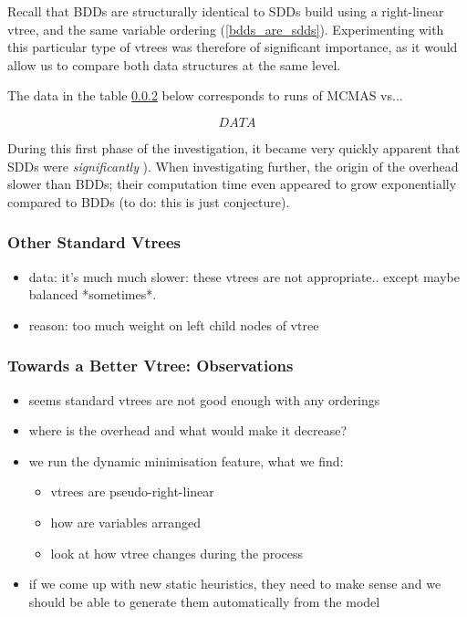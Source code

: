 \documentclass[11pt]{article}
\begin{document}
Recall that BDDs are structurally identical to SDDs build using a right-linear vtree, and the same variable ordering (\ref{bdds_are_sdds}). Experimenting with this particular type of vtrees was therefore of significant importance, as it would allow us to compare both data structures at the same level.  

The data in the table \ref{} below corresponds to runs of MCMAS vs...

$$DATA$$

During this first phase of the investigation, it became very quickly apparent that SDDs were \textit{significantly }). 
When investigating further, the origin of the overhead slower than BDDs; their computation time even appeared to grow exponentially compared to BDDs (to do: this is just conjecture). 




\subsubsection{Other Standard Vtrees}

\begin{itemize}
\item data: it's much much slower: these vtrees are not appropriate.. except maybe balanced *sometimes*. 
\item reason: too much weight on left child nodes of vtree 
\end{itemize}

\subsubsection{Towards a Better Vtree: Observations}

\begin{itemize}
\item seems standard vtrees are not good enough with any orderings 
\item where is the overhead and what would make it decrease? 
\item we run the dynamic minimisation feature, what we find: 
\begin{itemize}
\item vtrees are pseudo-right-linear
\item how are variables arranged
\item look at how vtree changes during the process
\end{itemize}
\item if we come up with new static heuristics, they need to make sense and we should be able to generate them automatically from the model 
\end{itemize}
\end{document}
